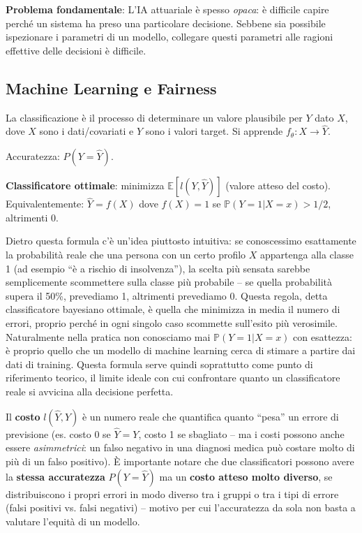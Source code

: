 \documentclass[a4paper,11pt]{article}
\begin{document}
\textbf{Problema fondamentale}: L'IA attuariale \`{e} spesso \emph{opaca}: \`{e} difficile capire perch\'{e} un sistema ha preso una particolare decisione. Sebbene sia possibile ispezionare i parametri di un modello, collegare questi parametri alle ragioni effettive delle decisioni \`{e} difficile.

\subsection{Machine Learning e Fairness}

\begin{definizione}[Classificazione]
La classificazione \`{e} il processo di determinare un valore plausibile per $Y$ dato $X$, dove $X$ sono i dati/covariati e $Y$ sono i valori target. Si apprende $f_\theta: X \to \hat{Y}$.

Accuratezza: $P(Y = \hat{Y})$.

\textbf{Classificatore ottimale}: minimizza $\mathbb{E}[l(Y, \hat{Y})]$ (valore atteso del costo). Equivalentemente: $\hat{Y} = f(X)$ dove $f(X) = 1$ se $\mathbb{P}(Y=1|X=x) > 1/2$, altrimenti $0$.
\end{definizione}

\begin{nota}
Dietro questa formula c'è un'idea piuttosto intuitiva: se conoscessimo esattamente la probabilità reale che una persona con un certo profilo $X$ appartenga alla classe 1 (ad esempio ``è a rischio di insolvenza''), la scelta più sensata sarebbe semplicemente scommettere sulla classe più probabile -- se quella probabilità supera il 50\%, prevediamo 1, altrimenti prevediamo 0. Questa regola, detta classificatore bayesiano ottimale, è quella che minimizza in media il numero di errori, proprio perché in ogni singolo caso scommette sull'esito più verosimile. Naturalmente nella pratica non conosciamo mai $\mathbb{P}(Y=1|X=x)$ con esattezza: è proprio quello che un modello di machine learning cerca di stimare a partire dai dati di training. Questa formula serve quindi soprattutto come punto di riferimento teorico, il limite ideale con cui confrontare quanto un classificatore reale si avvicina alla decisione perfetta.
\end{nota}

\begin{nota}
Il \textbf{costo} $l(\hat{Y}, Y)$ \`{e} un numero reale che quantifica quanto ``pesa'' un errore di previsione (es. costo 0 se $\hat{Y}=Y$, costo 1 se sbagliato -- ma i costi possono anche essere \emph{asimmetrici}: un falso negativo in una diagnosi medica pu\`{o} costare molto di pi\`{u} di un falso positivo). \`{E} importante notare che due classificatori possono avere la \textbf{stessa accuratezza} $P(Y=\hat{Y})$ ma un \textbf{costo atteso molto diverso}, se distribuiscono i propri errori in modo diverso tra i gruppi o tra i tipi di errore (falsi positivi vs. falsi negativi) -- motivo per cui l'accuratezza da sola non basta a valutare l'equit\`{a} di un modello.
\end{nota}
\end{document}
